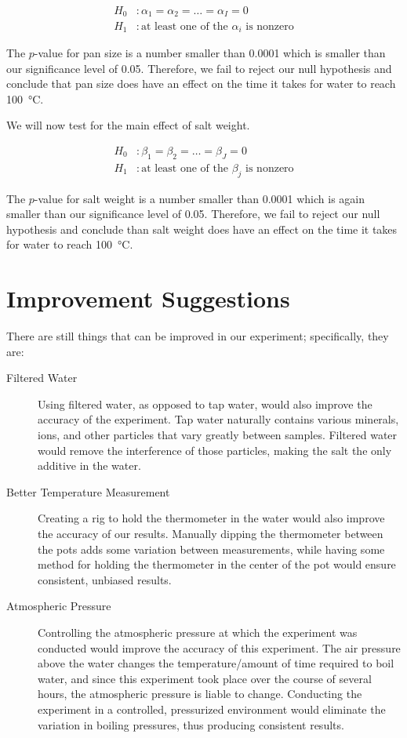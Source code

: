 \documentclass[12pt,titlepage=false]{scrartcl}
\begin{document}
\begin{align*}
    H_0&: \alpha_1 = \alpha_2 = \ldots = \alpha_I = 0 \\
    H_1&: \text{at least one of the $\alpha_i$ is nonzero}
\end{align*}

The $p$-value for pan size is a number smaller than \num{0.0001} which is smaller than our significance level of \num{0.05}. Therefore, we fail to reject our null hypothesis and conclude that pan size does have an effect on the time it takes for water to reach \SI{100}{\degreeCelsius}.

We will now test for the main effect of salt weight.

\begin{align*}
    H_0&: \beta_1 = \beta_2 = \ldots = \beta_J = 0 \\
    H_1&: \text{at least one of the $\beta_j$ is nonzero}
\end{align*}


The $p$-value for salt weight is a number smaller than \num{0.0001} which is again smaller than our significance level of \num{0.05}. Therefore, we fail to reject our null hypothesis and conclude than salt weight does have an effect on the time it takes for water to reach \SI{100}{\degreeCelsius}.

\section{Improvement Suggestions}
\label{sec:improvement_suggestions}
There are still things that can be improved in our experiment; specifically, they are:

\begin{description}
    \item[Filtered Water] Using filtered water, as opposed to tap water, would also improve the accuracy of the experiment.  Tap water naturally contains various minerals, ions, and other particles that vary greatly between samples.  Filtered water would remove the interference of those particles, making the salt the only additive in the water.

    \item[Better Temperature Measurement] Creating a rig to hold the thermometer in the water would also improve the accuracy of our results.  Manually dipping the thermometer between the pots adds some variation between measurements, while having some method for holding the thermometer in the center of the pot would ensure consistent, unbiased results.

    \item[Atmospheric Pressure] Controlling the atmospheric pressure at which the experiment was conducted would improve the accuracy of this experiment.  The air pressure above the water changes the temperature/amount of time required to boil water, and since this experiment took place over the course of several hours, the atmospheric pressure is liable to change.  Conducting the experiment in a controlled, pressurized environment would eliminate the variation in boiling pressures, thus producing consistent results.
\end{description}
\end{document}
